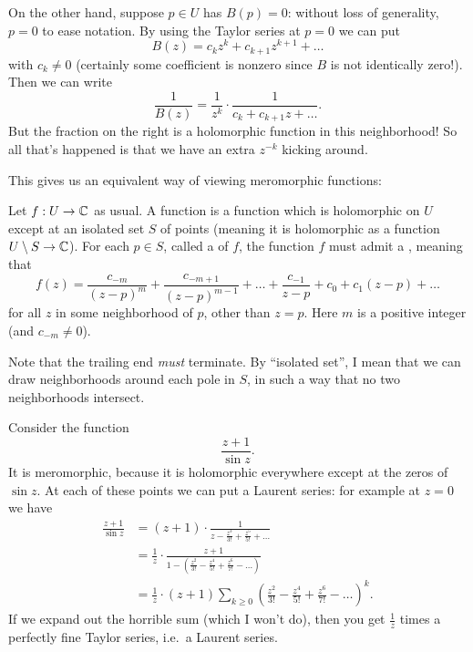 On the other hand, suppose $p \in U$ has $B(p) = 0$: without loss of generality, $p=0$
to ease notation.
By using the Taylor series at $p=0$ we can put
\[ B(z) = c_kz^k + c_{k+1}z^{k+1} + \dots \]
with $c_k \neq 0$
(certainly some coefficient is nonzero since $B$ is not identically zero!).
Then we can write
\[ \frac{1}{B(z)} = \frac{1}{z^k} \cdot \frac{1}{c_k + c_{k+1}z + \dots}. \]
But the fraction on the right is a holomorphic function in this neighborhood!
So all that's happened is that we have an extra $z^{-k}$ kicking around.




This gives us an equivalent way of viewing meromorphic functions:

\begin{definition}
	Let $f : U \to \mathbb C$ as usual.
	A  function is a function which is holomorphic on $U$
	except at an isolated set $S$ of points (meaning it is holomorphic as a function $U \setminus S \to \mathbb C$).
	For each $p \in S$, called a  of $f$, the function $f$ must admit a ,
	meaning that
	\[
		f(z) =
		\frac{c_{-m}}{(z-p)^m}
		+ \frac{c_{-m+1}}{(z-p)^{m-1}}
		+ \dots
		+ \frac{c_{-1}}{z-p} + c_0 + c_1 (z-p) + \dots
	\]
	for all $z$ in some neighborhood of $p$, other than $z = p$.
	Here $m$ is a positive integer (and $c_{-m} \neq 0$).
\end{definition}
Note that the trailing end \emph{must} terminate.
By ``isolated set'', I mean that we can draw neighborhoods around each pole in $S$,
in such a way that no two neighborhoods intersect.

\begin{example}
	Consider the function \[ \frac{z+1}{\sin z}. \]
	It is meromorphic, because it is holomorphic everywhere except at the zeros of $\sin z$.
	At each of these points we can put a Laurent series: for example at $z=0$ we have
	\begin{align*}
		\frac{z+1}{\sin z}
		&= (z+1) \cdot \frac{1}{z - \frac{z^3}{3!} + \frac{z^5}{5!} + \dots} \\
		&= \frac 1z \cdot \frac{z+1}{1 - \left(%
			\frac{z^2}{3!} - \frac{z^4}{5!} + \frac{z^6}{7!} - \dots \right)} \\
		&= \frac 1z \cdot (z+1) \sum_{k \ge 0} \left( %
			\frac{z^2}{3!}-\frac{z^4}{5!}+\frac{z^6}{7!}-\dots \right)^k.
	\end{align*}
	If we expand out the horrible sum (which I won't do),
	then you get $\frac 1z$ times a perfectly
	fine Taylor series, i.e.\ a Laurent series.
\end{example}

